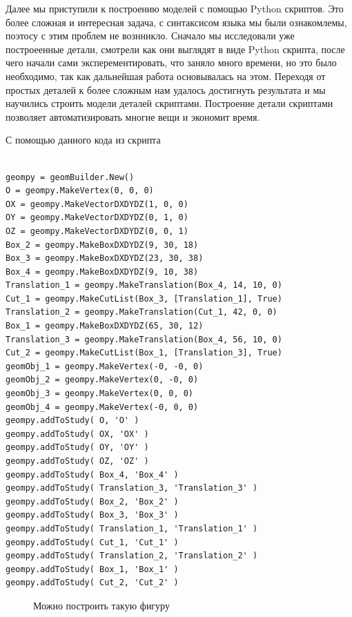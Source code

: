 \documentclass[a4paper,12pt]{article}
\theoremstyle{plain} %
\theoremstyle{definition} %
\theoremstyle{remark} %
\begin{document}
Далее мы приступили к построению моделей с помощью Python скриптов. Это более сложная и интересная задача, с синтаксисом языка мы были ознакомлемы, поэтосу с этим проблем не вознникло. Сначало мы исследовали уже построеенные детали, смотрели как они выглядят в виде Python скрипта, после чего начали сами эксперементировать, что заняло много времени, но это было необходимо, так как дальнейшая работа основывалась на этом. Переходя от простых деталей к более сложным нам удалось достигнуть результата и мы научились строить модели деталей скриптами. Построение детали скриптами позволяет автоматизировать многие вещи и экономит время.


С помощью данного кода из скрипта

\begin{verbatim}

geompy = geomBuilder.New()
O = geompy.MakeVertex(0, 0, 0)
OX = geompy.MakeVectorDXDYDZ(1, 0, 0)
OY = geompy.MakeVectorDXDYDZ(0, 1, 0)
OZ = geompy.MakeVectorDXDYDZ(0, 0, 1)
Box_2 = geompy.MakeBoxDXDYDZ(9, 30, 18)
Box_3 = geompy.MakeBoxDXDYDZ(23, 30, 38)
Box_4 = geompy.MakeBoxDXDYDZ(9, 10, 38)
Translation_1 = geompy.MakeTranslation(Box_4, 14, 10, 0)
Cut_1 = geompy.MakeCutList(Box_3, [Translation_1], True)
Translation_2 = geompy.MakeTranslation(Cut_1, 42, 0, 0)
Box_1 = geompy.MakeBoxDXDYDZ(65, 30, 12)
Translation_3 = geompy.MakeTranslation(Box_4, 56, 10, 0)
Cut_2 = geompy.MakeCutList(Box_1, [Translation_3], True)
geomObj_1 = geompy.MakeVertex(-0, -0, 0)
geomObj_2 = geompy.MakeVertex(0, -0, 0)
geomObj_3 = geompy.MakeVertex(0, 0, 0)
geomObj_4 = geompy.MakeVertex(-0, 0, 0)
geompy.addToStudy( O, 'O' )
geompy.addToStudy( OX, 'OX' )
geompy.addToStudy( OY, 'OY' )
geompy.addToStudy( OZ, 'OZ' )
geompy.addToStudy( Box_4, 'Box_4' )
geompy.addToStudy( Translation_3, 'Translation_3' )
geompy.addToStudy( Box_2, 'Box_2' )
geompy.addToStudy( Box_3, 'Box_3' )
geompy.addToStudy( Translation_1, 'Translation_1' )
geompy.addToStudy( Cut_1, 'Cut_1' )
geompy.addToStudy( Translation_2, 'Translation_2' )
geompy.addToStudy( Box_1, 'Box_1' )
geompy.addToStudy( Cut_2, 'Cut_2' )

\end{verbatim}
\newpage




	\begin{figure}[h]
		\caption{Можно построить такую фигуру}
	\end{figure}
	
\end{document}

